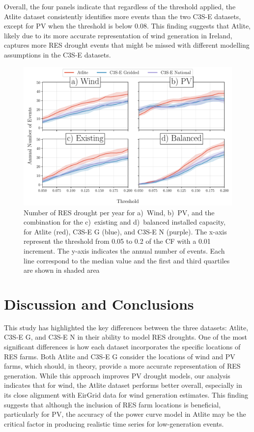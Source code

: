 \documentclass[a4paper, 11pt]{article}
\begin{document}
Overall, the four panels indicate that regardless of the threshold applied, the Atlite dataset consistently identifies more events than the two C3S-E datasets, except for PV when the threshold is below 0.08. This finding suggests that Atlite, likely due to its more accurate representation of wind generation in Ireland, captures more RES drought events that might be missed with different modelling assumptions in the C3S-E datasets.

\begin{figure}[!ht]
	\centering
	\includegraphics[width=\textwidth]{droughts_varying_threshold}
	\caption{Number of RES drought per year for a)~Wind, b)~PV, and the combination for the c)~existing and d)~balanced installed capacity, for Atlite (red), C3S-E G (blue), and C3S-E N (purple). The x-axis represent the threshold from 0.05 to 0.2 of the CF with a 0.01 increment. The y-axis indicates the annual number of events. Each line correspond to the median value and the first and third quartiles are shown in shaded area}
	\label{fig:number_days_threshold}
\end{figure}

\newpage
\section{Discussion and Conclusions}
\label{sec:Conclusion}

This study has highlighted the key differences between the three datasets: Atlite, C3S-E G, and C3S-E N in their ability to model RES droughts. One of the most significant differences is how each dataset incorporates the specific locations of RES farms. Both Atlite and C3S-E G consider the locations of wind and PV farms, which should, in theory, provide a more accurate representation of RES generation. While this approach improves PV drought models, our analysis indicates that for wind, the Atlite dataset performs better overall, especially in its close alignment with EirGrid data for wind generation estimates. This finding suggests that although the inclusion of RES farm locations is beneficial, particularly for PV, the accuracy of the power curve model in Atlite may be the critical factor in producing realistic time series for low-generation events.
\end{document}
